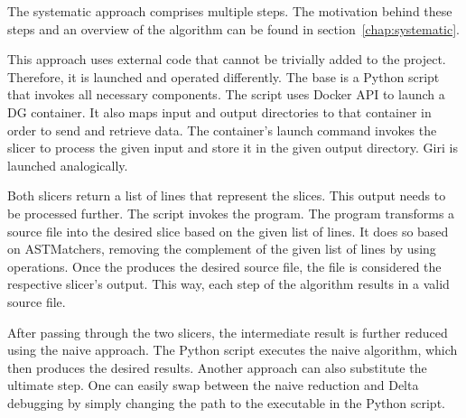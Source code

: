 
The systematic approach comprises multiple steps.
The motivation behind these steps and an overview of the algorithm can be 
found in section~\ref{chap:systematic}.

This approach uses external code that cannot be trivially added to 
the project.
Therefore, it is launched and operated differently.
The base is a Python script that invokes all necessary components.
The script uses Docker API to launch a DG container.
It also maps input and output directories to that container in order to send 
and retrieve data.
The container's launch command invokes the slicer to process the given input 
and store it in the given output directory.
Giri is launched analogically.

Both slicers return a list of lines that represent the slices.
This output needs to be processed further.
The script invokes the  program.
The program transforms a source file into the desired slice based on 
the given list of lines.
It does so based on ASTMatchers, removing the complement of the given list 
of lines by using  operations.
Once the  produces the desired source file, the file 
is considered the respective slicer's output.
This way, each step of the algorithm results in a valid source file.

After passing through the two slicers, the intermediate result is further 
reduced using the naive approach.
The Python script executes the naive algorithm, which then produces the 
desired results.
Another approach can also substitute the ultimate step.
One can easily swap between the naive reduction and Delta debugging by 
simply changing the path to the executable in the Python script.